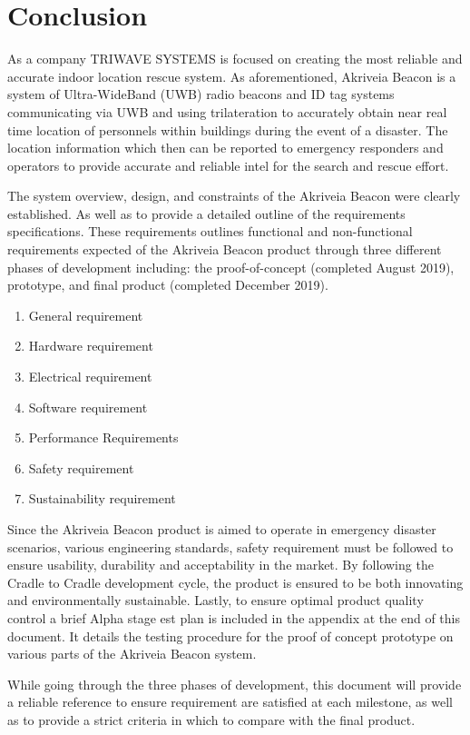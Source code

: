 

\setcounter{section}{5}
\section{Conclusion}
\bigskip
As a company TRIWAVE SYSTEMS is focused on creating the most reliable and accurate indoor location rescue system. As aforementioned, Akriveia Beacon is a system of Ultra-WideBand (UWB) radio beacons and ID tag systems communicating via UWB and using trilateration to accurately obtain near real time location of personnels within buildings during the event of a disaster. The location information which then can be reported to emergency responders and operators to provide accurate and reliable intel for the search and rescue effort. 

\bigskip
The system overview, design, and constraints of the Akriveia Beacon were clearly established. As well as to provide a detailed outline of the requirements specifications. These requirements outlines functional and non-functional requirements expected of the Akriveia Beacon product through three different phases of development including: the proof-of-concept (completed August 2019), prototype, and final product (completed December 2019).

\begin{enumerate}
\setlength\itemsep{0.25em}
	\item General requirement 
	\item Hardware requirement 
	\item Electrical requirement 
	\item Software requirement 
	\item Performance Requirements
	\item Safety requirement 
	\item Sustainability  requirement 
\end{enumerate}


Since the Akriveia Beacon product is aimed to operate in emergency disaster scenarios, various engineering standards, safety requirement must be followed to ensure usability, durability and acceptability in the market. By following the Cradle to Cradle development cycle, the product is ensured to be both innovating and environmentally sustainable. Lastly, to ensure optimal product quality control a brief Alpha stage est plan is included in the appendix at the end of this document. It details the testing procedure for the proof of concept prototype on various parts of the Akriveia Beacon system.

\bigskip
While going through the three phases of development, this document will provide a reliable
reference to ensure requirement are satisfied at each milestone, as well as to provide a strict criteria in which to compare with the final product.

%